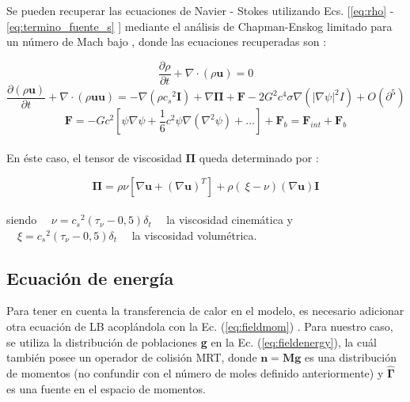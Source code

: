 Se pueden recuperar las ecuaciones de Navier - Stokes utilizando Ecs. [\ref{eq:rho} - \ref{eq:termino_fuente_s} ] mediante el análisis de Chapman-Enskog limitado para un número de Mach bajo \cite{li2013lattice}, donde las ecuaciones recuperadas son \cite{fogliatto2019simulation} \cite{li2013lattice}:

\begin{equation}
	\frac{\partial \rho }{\partial t}  + \nabla \cdot \left( \rho \mathbf{u} \right) = 0
\end{equation}
\begin{equation}
	\frac{\partial \left( \rho \mathbf{u}\right)}{\partial t} + \nabla \cdot \left( \rho \mathbf{u} \mathbf{u}\right) = - \nabla \left( \rho {c_{s}}^{2} \mathbf{I} \right) + \nabla \mathbf{\Pi} + \mathbf{F} - 2 G^{2} c^{4} \sigma \nabla \left( {|\nabla \psi	|}^{2} I	\right) + O (\partial^{5})
\end{equation}
\begin{equation}
\mathbf{F} = - G c^{2} \left[	\psi \nabla \psi + \frac{1}{6} c^{2} \psi \nabla \left( \nabla^{2} \psi\right) + ...\right] + \mathbf{F}_{b} = \mathbf{F}_{int} + \mathbf{F}_{b}
\end{equation}
\\
En éste caso, el tensor de viscosidad $\mathbf{\Pi}$ queda determinado por :

\begin{equation}
	\mathbf{\Pi} = \rho \nu \left[	\nabla \mathbf{u} + {\left(\nabla \mathbf{u}\right)}^{T}\right] + \rho \left(\ \xi - \nu \right) \left( \nabla \mathbf{u}\right) \mathbf{I}
\end{equation}
\\
siendo $\quad\nu = {c_{s}}^{2} (\tau_{\nu}- 0,5) \delta_{t}\quad$ la viscosidad cinemática y $\quad\xi = {c_{s}}^{2} (\tau_{\nu}- 0,5) \delta_{t}\quad$ la viscosidad volumétrica.



\subsection{Ecuación de energía}

Para tener en cuenta la transferencia de calor en el modelo, es necesario adicionar otra ecuación de LB acoplándola con la Ec. (\ref{eq:fieldmom}) \cite{li2013lattice}. Para nuestro caso, se utiliza la distribución de poblaciones \textbf{g} en la Ec. (\ref{eq:fieldenergy}), la cuál también posee un operador de colisión MRT, donde $\mathbf{n} = \mathbf{M} \mathbf{g}$ es una distribución de momentos (no confundir con el número de moles definido anteriormente) y $\mathbf{\hat{\Gamma}}$ es una fuente en el espacio de momentos.


